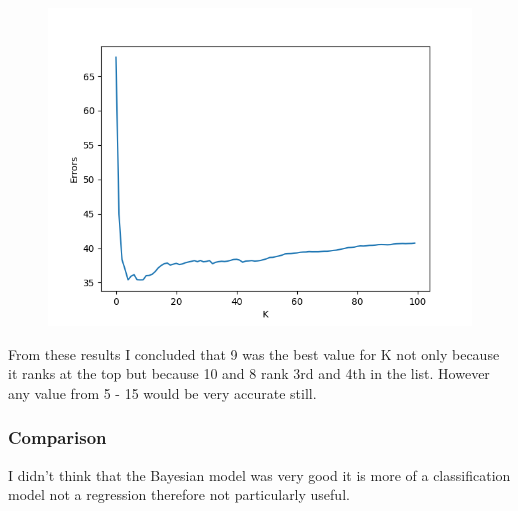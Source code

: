 \documentclass[11pt]{article}
\begin{document}
	\begin{figure}[!htb]
		\centering
		\begin{minipage}{.8\textwidth}
			\centering
			\includegraphics[width=.8\linewidth]{Resources/PartTwo/searchingForK_20220110_065714.png}
			\label{Img:KSearch}
		\end{minipage}%
		\begin{minipage}{.2\textwidth}
			\centering
			\label{Img:KSearchRaw}
		\end{minipage}
	\end{figure}
	
	From these results I concluded that 9 was the best value for K not only because it ranks at the top but because 10 and 8 rank 3rd and 4th in the list. However any value from 5 - 15 would be very accurate still.
	\subsubsection{Comparison}
	I didn't think that the Bayesian model was very good it is more of a classification model not a regression therefore not particularly useful.
	
\end{document}
